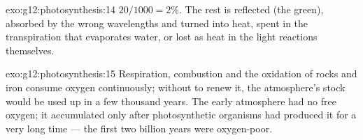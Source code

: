 \begin{solution}{exo:g12:photosynthesis:14}
$20/1000 = 2\%$. The rest is reflected (the green), absorbed by the
wrong wavelengths and turned into heat, spent in the transpiration
that evaporates water, or lost as heat in the light reactions
themselves.
\end{solution}

\begin{solution}{exo:g12:photosynthesis:15}
Respiration, combustion and the oxidation of rocks and iron consume
oxygen continuously; without  to renew it, the
atmosphere's stock would be used up in a few thousand years. The
early atmosphere had no free oxygen; it accumulated only after
photosynthetic organisms had produced it for a very long time --- the
first two billion years were oxygen-poor.
\end{solution}

